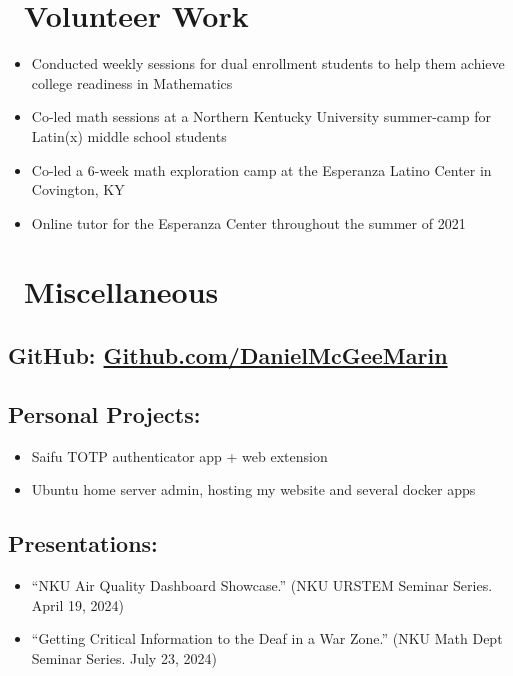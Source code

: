 \documentclass{resume}
\begin{document}
\section{\faHeartO\ Volunteer Work}
\begin{itemize}[parsep=0.5ex]
    \item Conducted weekly sessions for dual enrollment students to help them achieve college readiness in Mathematics
\end{itemize}
\begin{itemize}[parsep=0.5ex]
    \item Co-led math sessions at a Northern Kentucky University summer-camp for Latin(x) middle school students
\end{itemize}
\begin{itemize}[parsep=0.5ex]
    \item Co-led a 6-week math exploration camp at the Esperanza Latino Center in Covington, KY
    \item Online tutor for the Esperanza Center throughout the summer of 2021
\end{itemize}


\section{\faInfo\ Miscellaneous}
\subsection{GitHub: \href{https://github.com/DanielMcGeeMarin}{Github.com/DanielMcGeeMarin}}
\subsection{Personal Projects:}
\begin{itemize}[parsep=0.5ex]
  \item Saifu TOTP authenticator app + web extension
  \item Ubuntu home server admin, hosting my website and several docker apps
\end{itemize}
\subsection{Presentations:}
\begin{itemize}[parsep=0.5ex]
  \item “NKU Air Quality Dashboard Showcase.” (NKU URSTEM Seminar Series. April 19, 2024)
  \item “Getting Critical Information to the Deaf in a War Zone.” (NKU Math Dept Seminar Series. July 23, 2024)
\end{itemize}


%
%
\end{document}
